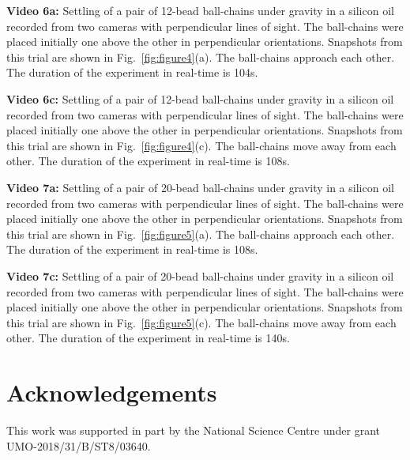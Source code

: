\documentclass{article}
\begin{document}
\textbf{Video 6a:}
Settling of a pair of 12-bead ball-chains under gravity in a silicon oil recorded from two cameras with perpendicular lines of sight.  The ball-chains were placed initially one above the other in perpendicular orientations. Snapshots from this trial are shown in 
Fig.~\ref{fig:figure4}(a). The ball-chains approach each other. 
The duration of the experiment in real-time is 104s.

\textbf{Video 6c:}
Settling of a pair of 12-bead ball-chains under gravity in a silicon oil recorded from two cameras with perpendicular lines of sight. The ball-chains were placed initially one above the other in perpendicular orientations. Snapshots from this trial are shown in 
Fig.~\ref{fig:figure4}(c). The ball-chains move away from each other.
The duration of the experiment in real-time is 108s.

\textbf{Video 7a:}
Settling of a pair of 20-bead ball-chains under gravity in a silicon oil recorded from two cameras with perpendicular lines of sight.  The ball-chains were placed initially one above the other in perpendicular orientations. Snapshots from this trial are shown in 
Fig.~\ref{fig:figure5}(a). The ball-chains approach each other. 
The duration of the experiment in real-time is 108s.

\textbf{Video 7c:}
Settling of a pair of 20-bead ball-chains under gravity in a silicon oil recorded from two cameras with perpendicular lines of sight.  The ball-chains were placed initially one above the other in perpendicular orientations. Snapshots from this trial are shown in 
Fig.~\ref{fig:figure5}(c). The ball-chains move away from each other. 
The duration of the experiment in real-time is 140s.

\section*{Acknowledgements}
This work was supported in part by the National Science Centre under
grant UMO-2018/31/B/ST8/03640. 


\end{document}
